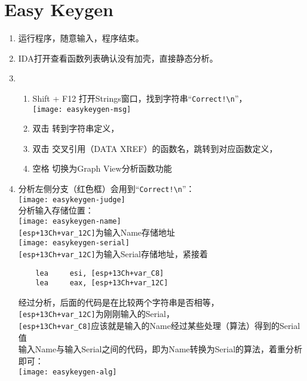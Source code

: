 \section{Easy Keygen}
\begin{enumerate}
\item 运行程序，随意输入，程序结束。\\
\item IDA打开查看函数列表确认没有加壳，直接静态分析。\\
\item
	\begin{enumerate}
	\item Shift + F12  打开Strings窗口，找到字符串“\lstinline$Correct!\n$”，\\
	\texttt{[image: easykeygen-msg]} \\
	\item 双击 转到字符串定义，\\
	\item 双击 交叉引用（DATA XREF）的函数名，跳转到对应函数定义，\\
	\item 空格 切换为Graph View分析函数功能 \\
	\end{enumerate} 
\item 
	分析左侧分支（红色框）会用到“\lstinline$Correct!\n$”：\\
	\texttt{[image: easykeygen-judge]} \\
	分析输入存储位置： \\
	\texttt{[image: easykeygen-name]} \\
	\lstinline$[esp+13Ch+var_12C]$为输入Name存储地址 \\
	\texttt{[image: easykeygen-serial]} \\
	\lstinline$[esp+13Ch+var_12C]$为输入Serial存储地址，紧接着 \\
	\begin{lstlisting}
	lea     esi, [esp+13Ch+var_C8]
	lea     eax, [esp+13Ch+var_12C]
	\end{lstlisting}
	经过分析，后面的代码是在比较两个字符串是否相等，\\
	\lstinline$[esp+13Ch+var_12C]$为刚刚输入的Serial，\\
	\lstinline$[esp+13Ch+var_C8]$应该就是输入的Name经过某些处理（算法）得到的Serial值 \\
	输入Name与输入Serial之间的代码，即为Name转换为Serial的算法，着重分析即可：\\
	\texttt{[image: easykeygen-alg]} \\

\end{enumerate}
